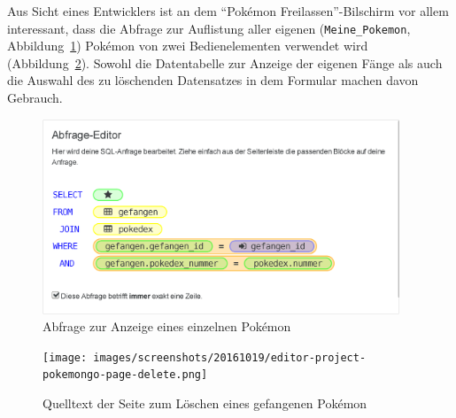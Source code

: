 Aus Sicht eines Entwicklers ist an dem "`Pokémon Freilassen"'-Bilschirm vor allem interessant, dass die Abfrage zur Auflistung aller eigenen (\texttt{Meine\_Pokemon}, Abbildung~\ref{fig:project-pokemongo-query-single-pokemon}) Pokémon von zwei Bedienelementen verwendet wird (Abbildung~\ref{fig:project-pokemongo-page-delete}). Sowohl die Datentabelle zur Anzeige der eigenen Fänge als auch die Auswahl des zu löschenden Datensatzes in dem Formular machen davon Gebrauch.

\begin{figure}[p]
  \centering \includegraphics[width=0.95\textwidth]{images/screenshots/20161019/editor-project-pokemongo-query-single-pokemon}
  \caption{Abfrage zur Anzeige eines einzelnen Pokémon}
  \label{fig:project-pokemongo-query-single-pokemon}
\end{figure}

\begin{figure}[p]
  \centering \texttt{[image: images/screenshots/20161019/editor-project-pokemongo-page-delete.png]}
  \caption{Quelltext der Seite zum Löschen eines gefangenen Pokémon}
  \label{fig:project-pokemongo-page-delete}
\end{figure}

